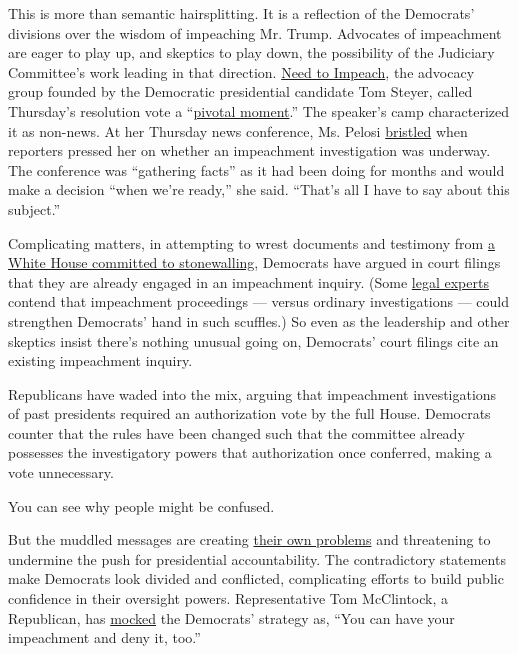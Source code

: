 This is more than semantic hairsplitting. It is a reflection of the
Democrats' divisions over the wisdom of impeaching Mr. Trump. Advocates
of impeachment are eager to play up, and skeptics to play down, the
possibility of the Judiciary Committee's work leading in that direction.
\href{https://www.needtoimpeach.com}{Need to Impeach}, the advocacy
group founded by the Democratic presidential candidate Tom Steyer,
called Thursday's resolution vote a
``\href{https://thehill.com/homenews/house/460793-dems-impeachment-message-leads-to-plenty-of-head-scratching}{pivotal
moment}.'' The speaker's camp characterized it as non-news. At her
Thursday news conference, Ms. Pelosi
\href{https://abcnews.go.com/Politics/pelosi-exasperated-repeated-impeachment-questions/story?id=65564443}{bristled}
when reporters pressed her on whether an impeachment investigation was
underway. The conference was ``gathering facts'' as it had been doing
for months and would make a decision ``when we're ready,'' she said.
``That's all I have to say about this subject.''

Complicating matters, in attempting to wrest documents and testimony
from
\href{https://www.nytimes.com/2019/04/25/us/politics/trump-white-house-democrats.html}{a
White House committed to stonewalling}, Democrats have argued in court
filings that they are already engaged in an impeachment inquiry. (Some
\href{https://beta.washingtonpost.com/opinions/2019/04/24/how-trump-is-making-his-own-impeachment-more-likely/}{legal
experts} contend that impeachment proceedings --- versus ordinary
investigations --- could strengthen Democrats' hand in such scuffles.)
So even as the leadership and other skeptics insist there's nothing
unusual going on, Democrats' court filings cite an existing impeachment
inquiry.

Republicans have waded into the mix, arguing that impeachment
investigations of past presidents required an authorization vote by the
full House. Democrats counter that the rules have been changed such that
the committee already possesses the investigatory powers that
authorization once conferred, making a vote unnecessary.

You can see why people might be confused.

But the muddled messages are creating
\href{https://www.politico.com/story/2019/09/10/impeachment-democrats-trump-1488401}{their
own problems} and threatening to undermine the push for presidential
accountability. The contradictory statements make Democrats look divided
and conflicted, complicating efforts to build public confidence in their
oversight powers. Representative Tom McClintock, a Republican, has
\href{https://www.cnn.com/videos/tv/2019/09/12/lead-manu-raju-live-jake-tapper.cnn}{mocked}
the Democrats' strategy as, ``You can have your impeachment and deny it,
too.''

